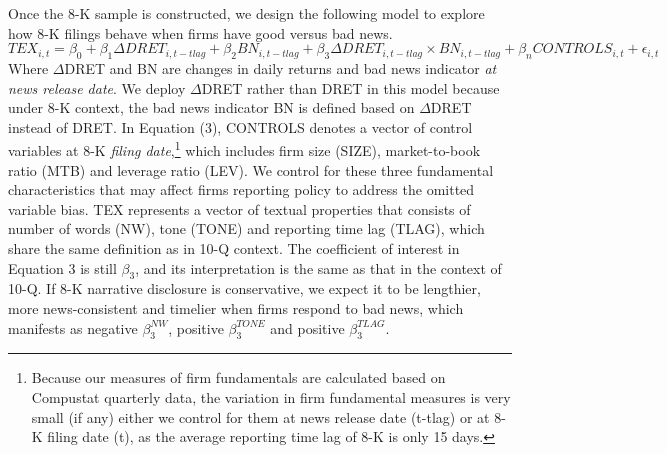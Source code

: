 \documentclass[a4paper]{article}
\begin{document}
\begin{spacing}{2}
Once the 8-K sample is constructed, we design the following model to explore how 8-K filings behave when firms have good versus bad news.
\begin{equation} \label{eq3}
TEX_{i,t}=\beta_0+\beta_1\Delta DRET_{i,t-tlag}+\beta_2BN_{i,t-tlag}+\beta_3\Delta DRET_{i,t-tlag}\times BN_{i,t-tlag}+\beta_nCONTROLS_{i,t}+\epsilon_{i,t}
\end{equation}
Where $\Delta$DRET and BN are changes in daily returns and bad news indicator \textit{at news release date}. We deploy $\Delta$DRET rather than DRET in this model because under 8-K context, the bad news indicator BN is defined based on $\Delta$DRET instead of DRET. In Equation (3), CONTROLS denotes a vector of control variables at 8-K \textit{filing date},\footnote{Because our measures of firm fundamentals are calculated based on Compustat quarterly data, the variation in firm fundamental measures is very small (if any) either we control for them at news release date (t-tlag) or at 8-K filing date (t), as the average reporting time lag of 8-K is only 15 days.} which includes firm size (SIZE), market-to-book ratio (MTB) and leverage ratio (LEV). We control for these three fundamental characteristics that may affect firms reporting policy to address the omitted variable bias. TEX represents a vector of textual properties that consists of number of words (NW), tone (TONE) and reporting time lag (TLAG), which share the same definition as in 10-Q context. The coefficient of interest in Equation 3 is still $\beta_3$, and its interpretation is the same as that in the context of 10-Q. If 8-K narrative disclosure is conservative, we expect it to be lengthier, more news-consistent and timelier when firms respond to bad news, which manifests as negative $\beta_3^{NW}$, positive  $\beta_3^{TONE}$ and positive $\beta_3^{TLAG}$.


\end{spacing}
\end{document}
